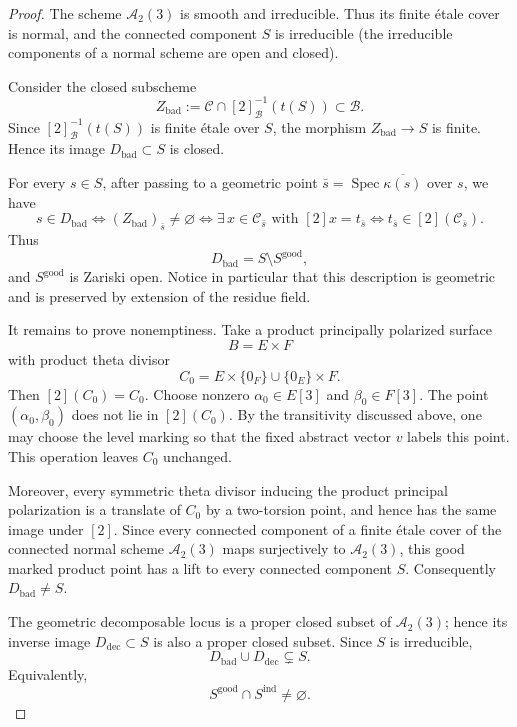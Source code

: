 \documentclass[12pt]{amsart}
\numberwithin{equation}{section}
\theoremstyle{definition}
\theoremstyle{remark}
\newcommand{\Spec}{\operatorname{Spec}}
\begin{document}
\begin{proof}
The scheme $\mathcal A_2(3)$ is smooth and irreducible.  Thus its finite
\'etale cover is normal, and the connected component $S$ is irreducible
(the irreducible components of a normal scheme are open and closed).

Consider the closed subscheme
\[
Z_{\mathrm{bad}}
:=
\mathscr C\cap [2]_{\mathscr B}^{-1}(t(S))
\subset \mathscr B.
\]
Since $[2]_{\mathscr B}^{-1}(t(S))$ is finite \'etale over $S$,
the morphism $Z_{\mathrm{bad}}\to S$ is finite.  Hence its image
$D_{\mathrm{bad}}\subset S$ is closed.

For every $s\in S$, after passing to a geometric point
$\bar s=\Spec\overline{\kappa(s)}$ over $s$, we have
\[
s\in D_{\mathrm{bad}}
\iff
(Z_{\mathrm{bad}})_{\bar s}\neq\varnothing
\iff
\exists\,x\in\mathscr C_{\bar s}
\text{ with }[2]x=t_{\bar s}
\iff
t_{\bar s}\in[2](\mathscr C_{\bar s}).
\]
Thus
\[
D_{\mathrm{bad}}=S\setminus S^{\mathrm{good}},
\]
and $S^{\mathrm{good}}$ is Zariski open.  Notice in particular that
this description is geometric and is preserved by extension of the
residue field.

It remains to prove nonemptiness.  Take a product principally polarized
surface
\[
B=E\times F
\]
with product theta divisor
\[
C_0
=
E\times\{0_F\}\cup\{0_E\}\times F.
\]
Then $[2](C_0)=C_0$.  Choose nonzero
$\alpha_0\in E[3]$ and $\beta_0\in F[3]$.  The point
$(\alpha_0,\beta_0)$ does not lie in $[2](C_0)$.
By the transitivity discussed above, one may choose the level marking
so that the fixed abstract vector $v$ labels this point.  This operation
leaves $C_0$ unchanged.

Moreover, every symmetric theta divisor inducing the product principal
polarization is a translate of $C_0$ by a two-torsion point, and hence
has the same image under $[2]$.  Since every connected component of a
finite \'etale cover of the connected normal scheme
$\mathcal A_2(3)$ maps surjectively to $\mathcal A_2(3)$, this good
marked product point has a lift to every connected component $S$.
Consequently $D_{\mathrm{bad}}\neq S$.

The geometric decomposable locus is a proper closed subset of
$\mathcal A_2(3)$; hence its inverse image
$D_{\mathrm{dec}}\subset S$ is also a proper closed subset.  Since
$S$ is irreducible,
\[
D_{\mathrm{bad}}\cup D_{\mathrm{dec}}\subsetneq S.
\]
Equivalently,
\[
S^{\mathrm{good}}\cap S^{\mathrm{ind}}\neq\varnothing.
\]
\end{proof}
\end{document}
